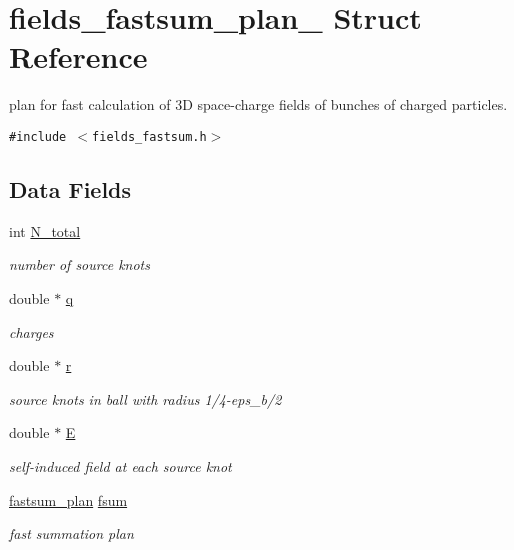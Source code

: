 \hypertarget{structfields__fastsum__plan__}{
\section{fields\_\-fastsum\_\-plan\_\- Struct Reference}
\label{structfields__fastsum__plan__}
}
plan for fast calculation of 3D space-charge fields of bunches of charged particles.  


{\tt \#include $<$fields\_\-fastsum.h$>$}

\subsection*{Data Fields}
\begin{CompactItemize}
\item 
\hypertarget{structfields__fastsum__plan___o0}{
int \hyperlink{structfields__fastsum__plan___o0}{N\_\-total}}
\label{structfields__fastsum__plan___o0}

\begin{CompactList}\small\item\em number of source knots \item\end{CompactList}\item 
\hypertarget{structfields__fastsum__plan___o1}{
double $\ast$ \hyperlink{structfields__fastsum__plan___o1}{q}}
\label{structfields__fastsum__plan___o1}

\begin{CompactList}\small\item\em charges \item\end{CompactList}\item 
\hypertarget{structfields__fastsum__plan___o2}{
double $\ast$ \hyperlink{structfields__fastsum__plan___o2}{r}}
\label{structfields__fastsum__plan___o2}

\begin{CompactList}\small\item\em source knots in ball with radius 1/4-eps\_\-b/2 \item\end{CompactList}\item 
\hypertarget{structfields__fastsum__plan___o3}{
double $\ast$ \hyperlink{structfields__fastsum__plan___o3}{E}}
\label{structfields__fastsum__plan___o3}

\begin{CompactList}\small\item\em self-induced field at each source knot \item\end{CompactList}\item 
\hypertarget{structfields__fastsum__plan___o4}{
\hyperlink{structfastsum__plan__}{fastsum\_\-plan} \hyperlink{structfields__fastsum__plan___o4}{fsum}}
\label{structfields__fastsum__plan___o4}

\begin{CompactList}\small\item\em fast summation plan \item\end{CompactList}\end{CompactItemize}


